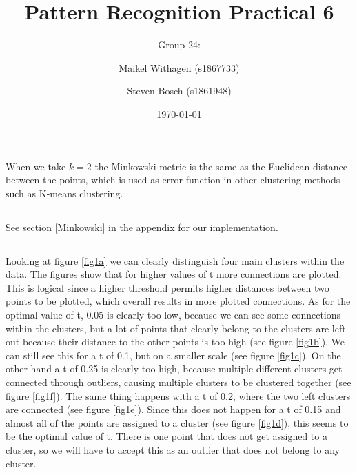 \documentclass[10pt]{article}
\title{Pattern Recognition Practical 6}
\author{Group 24: \and Maikel Withagen (s1867733) \and Steven Bosch (s1861948)}
\date{\today}
\begin{document}
\maketitle

\section{}
\subsection{}
When we take $k=2$ the Minkowski metric is the same as the Euclidean distance between the points, which is used as error function in other clustering methods such as K-means clustering.

\subsection{}
See section \ref{Minkowski} in the appendix for our implementation.

\subsection{}
Looking at figure \ref{fig1a} we can clearly distinguish four main clusters within the data. The figures show that for higher values of t more connections are plotted. This is logical since a higher threshold permits higher distances between two points to be plotted, which overall results in more plotted connections. As for the optimal value of t, 0.05 is clearly too low, because we can see some connections within the clusters, but a lot of points that clearly belong to the clusters are left out because their distance to the other points is too high (see figure \ref{fig1b}). We can still see this for a t of 0.1, but on a smaller scale (see figure \ref{fig1c}). On the other hand a t of 0.25 is clearly too high, because multiple different clusters get connected through outliers, causing multiple clusters to be clustered together (see figure \ref{fig1f}). The same thing happens with a t of 0.2, where the two left clusters are connected (see figure \ref{fig1e}). Since this does not happen for a t of 0.15 and almost all of the points are assigned to a cluster (see figure \ref{fig1d}), this seems to be the optimal value of t. There is one point that does not get assigned to a cluster, so we will have to accept this as an outlier that does not belong to any cluster. 
\end{document}
